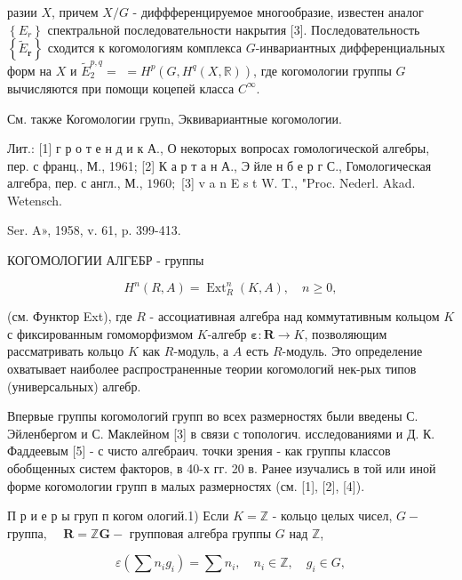 \documentclass[10pt]{article}
\begin{document}
разии $X$, причем $X / G$ - диффференцируемое многообразие, известен аналог $\left\{E_{r}\right\}$ спектральной последовательности накрытия [3]. Последовательность $\left\{\tilde{E}_{\boldsymbol{r}}\right\}$ сходится к когомологиям комплекса $G$-инвариантных дифференциальных форм на $X$ и $\tilde{E}_{2}^{p, q}=$ $=H^{p}\left(G, H^{q}(X, \mathbb{R})\right)$, где когомологии группы $G$ вычисляются при помощи коцепей класса $C^{\infty}$.



См. также Когомологии групn, Эквивариантные когомологии.



Лит.: [1] г р о т е н д и к А., О некоторых вопросах гомологической алгебры, пер. с франц., М., 1961; [2] К а р т а н А., Э йле н б е р г С., Гомологическая алгебра, пер. с англ., М., $1960 ;$ [3] v a n E s t W. T., "Proc. Nederl. Akad. Wetensch.

Ser. A», 1958, v. 61, p. 399-413.



КОГОМОЛОГИИ АЛГЕБР - группы



\[

H^{n}(R, A)=\operatorname{Ext}_{R}^{n}(K, A), \quad n \geqslant 0,

\]



(см. Функтор Ext), где $R$ - ассоциативная алгебра над коммутативным кольцом $K$ с фиксированным гомоморфизмом $K$-алгебр $\boldsymbol{\varepsilon}: \boldsymbol{R} \rightarrow K$, позволяющим рассматривать кольцо $K$ как $R$-модуль, а $A$ есть $R$-модуль. Это определение охватывает наиболее распространенные теории когомологий нек-рых типов (универсальных) алгебр.



Впервые группы когомологий групп во всех размерностях были введены С. Эйленбергом и С. Маклейном [3] в связи с топологич. исследованиями и Д. К. Фаддеевым [5] - с чисто алгебраич. точки зрения - как группы классов обобщенных систем факторов, в 40-х гг. 20 в. Ранее изучались в той или иной форме когомологии групп в малых размерностях (см. [1], [2], [4]).



П р и е р ы груп п когом ологий.1) Если $K=\mathbb{Z}$ - кольцо целых чисел, $G-$ группа, $\quad \boldsymbol{R}=\mathbb{Z} \boldsymbol{G}-$ групповая алгебра группы $G$ над $\mathbb{Z}$,



\[

\varepsilon\left(\sum n_{i} g_{i}\right)=\sum n_{i}, \quad n_{i} \in \mathbb{Z}, \quad g_{i} \in G,

\]
\end{document}
